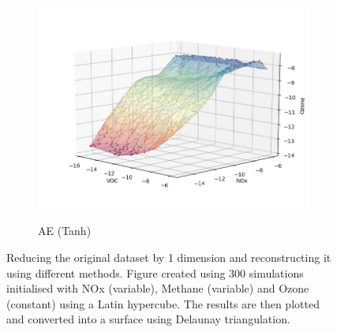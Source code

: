 \begin{figure}[H]
\begin{subfigure}{.33\textwidth}
  \includegraphics[width=\textwidth]{4fig/rae.png}
  \label{fig:ae}
  \caption{AE (Tanh)}
\end{subfigure}%


\caption{Reducing the original dataset by 1 dimension and reconstructing it using different methods. Figure created using 300 simulations initialised with NOx (variable), Methane (variable) and Ozone (constant) using a Latin hypercube. The results are then plotted and converted into a surface using Delaunay triangulation. }
\end{figure}

%
%
%
%


